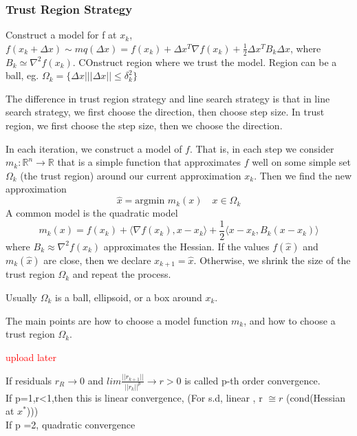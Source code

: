 \subsubsection{Trust Region Strategy}
\begin{problem}
  Construct a model for f at $x_k$, $f(x_k+\Delta x)\sim mq(\Delta x)=f(x_k)+\Delta x^T\nabla f(x_k)+\frac{1}{2}\Delta x^TB_k\Delta x$,
  where $B_k\simeq \nabla^2 f(x_k)$. COnstruct region where we trust the model. Region can be a ball,
  eg. $\Omega_k=\{\Delta x| ||\Delta x||\leq \delta_k^2\}$
\end{problem}
The difference in trust region strategy and line search strategy is that in line search strategy, we first choose the direction, then choose step size. In trust region, we first choose the step size, then we choose the direction.
\begin{definition}
  In each iteration, we construct a model of $f$. That is, in each step we consider $m_k: \mathbb R^n \to \mathbb R$ that is a simple function that approximates $f$ well on some simple set $\Omega_k$ (the trust region) around our current approximation $x_k$. Then we find the new approximation $$\hat x = \text{argmin } m_k(x) \quad \text{$x \in \Omega_k$}$$
  A common model is the quadratic model $$m_k(x) = f(x_k) + \langle \nabla f(x_k), x - x_k \rangle + \frac{1}{2} \langle x - x_k, B_k(x - x_k) \rangle$$ where $B_k \approx \nabla^2 f(x_k)$ approximates the Hessian. If the values $f(\hat x)$ and $m_k(\hat x)$ are close, then we declare $x_{k+1} = \hat x$. Otherwise, we shrink the size of the trust region $\Omega_k$ and repeat the process.

  Usually $\Omega_k$ is a ball, ellipsoid, or a box around $x_k$.

  The main points are how to choose a model function $m_k$, and how to choose a trust region $\Omega_k$.
\end{definition}


\begin{definition}
  \textcolor{red}{upload later}
\end{definition}

\begin{definition}
    If residuals $r_R\to 0$ and 
    $lim\frac{||r_{k+1}||}{||r_k||^p}\to r >0$ is called p-th order convergence.
    \\ If p=1,r<1,then this is linear convergence, (For s.d, linear , r $\cong r$ (cond(Hessian at $x^*$)))
    \\ If p =2, quadratic convergence
\end{definition}

